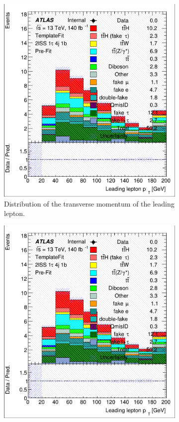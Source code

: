 \captionsetup[subfigure]{justification=centering}
\begin{figure}[htb!]
    \centering
    \begin{subfigure}{0.45\textwidth}
        \includegraphics[width=\linewidth]{figures/plots/histograms/lep_pt_0.png}
        \caption{Distribution of the transverse momentum of the leading lepton.}
        \label{fig:lep_pt_0}
    \end{subfigure}\hfill%
    \begin{subfigure}{0.45\textwidth}
        \includegraphics[width=\linewidth]{figures/plots/histograms/lep_pt_1.png}

\end{subfigure}
\end{figure}

